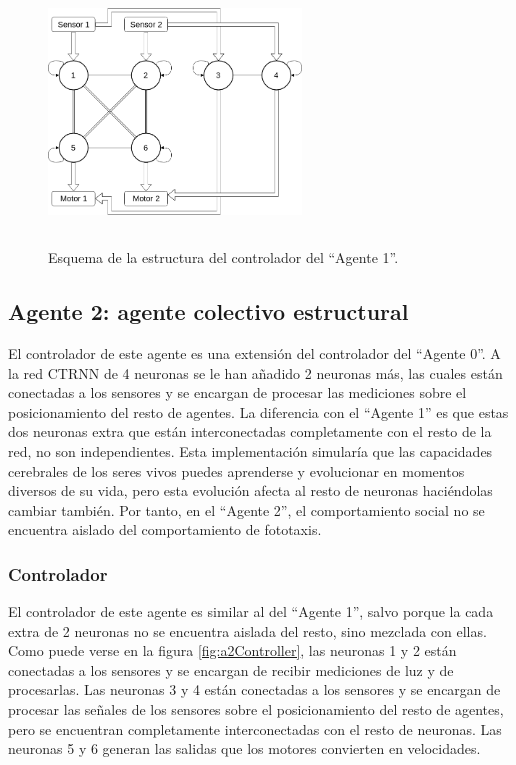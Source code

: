 \begin{figure}[H]
	\centering
	\includegraphics[width=0.6\textwidth,height=7cm]{Imagenes/Agent1Controller}
	\caption{Esquema de la estructura del controlador del ``Agente 1''.}
	\label{fig:a1Controller}
\end{figure}

\subsection{Agente 2: agente colectivo estructural}
El controlador de este agente es una extensión del controlador del ``Agente 0''. A la red CTRNN de 4 neuronas se le han añadido 2 neuronas más, las cuales están conectadas a los sensores y se encargan de procesar las mediciones sobre el posicionamiento
del resto de agentes. La diferencia con el ``Agente 1'' es que estas dos neuronas extra que están interconectadas completamente con el resto de la red, no son independientes. Esta implementación simularía que las capacidades cerebrales de los seres vivos
puedes aprenderse y evolucionar en momentos diversos de su vida, pero esta evolución afecta al resto de neuronas haciéndolas cambiar también. Por tanto, en el ``Agente 2'', el comportamiento social no se encuentra aislado del comportamiento de fototaxis.
\subsubsection{Controlador}
El controlador de este agente es similar al del ``Agente 1'', salvo porque la cada extra de 2 neuronas no se encuentra aislada del resto, sino mezclada con ellas. Como puede verse en la figura \ref{fig:a2Controller}, las neuronas 1 y 2 están conectadas
a los sensores y se encargan de recibir mediciones de luz y de procesarlas. Las neuronas 3 y 4 están conectadas a los sensores y se encargan de procesar las señales de los sensores sobre el posicionamiento del resto de agentes, pero se encuentran completamente
interconectadas con el resto de neuronas. Las neuronas 5 y 6 generan las salidas que los motores convierten en velocidades.

